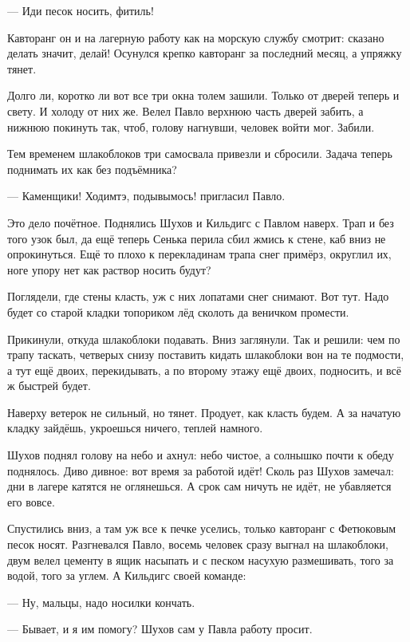 --- Иди песок носить, фитиль!

Кавторанг \dash он и на лагерную работу как на морскую службу смотрит: сказано делать \dash значит,
делай! Осунулся крепко кавторанг за последний месяц, а упряжку тянет.

Долго ли, коротко ли \dash вот все три окна толем зашили. Только от дверей теперь и свету. И
холоду от них же. Велел Павло верхнюю часть дверей забить, а нижнюю покинуть \dash так, чтоб,
голову нагнувши, человек войти мог. Забили.

Тем временем шлакоблоков три самосвала привезли и сбросили. Задача теперь \dash поднимать их
как без подъёмника?

--- Каменщики! Ходимтэ, подывымось! \dash пригласил Павло.

Это \dash дело почётное. Поднялись Шухов и Кильдигс с Павлом наверх. Трап и без того узок был, да
ещё теперь Сенька перила сбил \dash жмись к стене, каб вниз не опрокинуться. Ещё то плохо \dash к
перекладинам трапа снег примёрз, округлил их, ноге упору нет \dash как раствор носить будут?

Поглядели, где стены класть, уж с них лопатами снег снимают. Вот тут. Надо будет со старой
кладки топориком лёд сколоть да веничком промести.

Прикинули, откуда шлакоблоки подавать. Вниз заглянули. Так и решили: чем по трапу таскать,
четверых снизу поставить кидать шлакоблоки вон на те подмости, а тут ещё двоих,
перекидывать, а по второму этажу ещё двоих, подносить, \dash и всё ж быстрей будет.

Наверху ветерок не сильный, но тянет. Продует, как класть будем. А за начатую кладку зайдёшь,
укроешься \dash ничего, теплей намного.

Шухов поднял голову на небо и ахнул: небо чистое, а солнышко почти к обеду поднялось. Диво
дивное: вот время за работой идёт! Сколь раз Шухов замечал: дни в лагере катятся \dash не
оглянешься. А срок сам \dash ничуть не идёт, не убавляется его вовсе.

Спустились вниз, а там уж все к печке уселись, только кавторанг с Фетюковым песок носят.
Разгневался Павло, восемь человек сразу выгнал на шлакоблоки, двум велел цементу в ящик
насыпать и с песком насухую размешивать, того \dash за водой, того \dash за углем. А Кильдигс \dash своей
команде:

--- Ну, мальцы, надо носилки кончать.

--- Бывает, и я им помогу? \dash Шухов сам у Павла работу просит.

